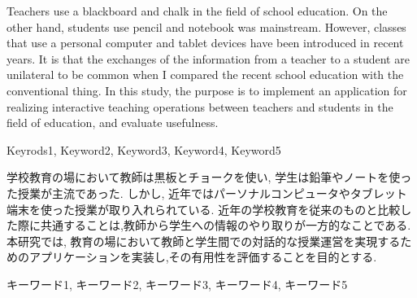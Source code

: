 \documentclass{funthesis}
\begin{document}
\maketitle       %

\begin{eabstract}
Teachers use a blackboard and chalk in the field of school education. On the other hand, students use pencil and notebook was mainstream. However, classes that use a personal computer and tablet devices have been introduced in recent years. It is that the exchanges of the information from a teacher to a student are unilateral to be common when I compared the recent school education with the conventional thing. In this study, the purpose is to implement an application for realizing interactive teaching operations between teachers and students in the field of education, and evaluate usefulness.
\end{eabstract}

\begin{ekeyword}
Keyrods1, Keyword2, Keyword3, Keyword4, Keyword5
\end{ekeyword}

\begin{jabstract}
学校教育の場において教師は黒板とチョークを使い, 学生は鉛筆やノートを使った授業が主流であった. しかし, 近年ではパーソナルコンピュータやタブレット端末を使った授業が取り入れられている. 近年の学校教育を従来のものと比較した際に共通することは,教師から学生への情報のやり取りが一方的なことである.本研究では, 教育の場において教師と学生間での対話的な授業運営を実現するためのアプリケーションを実装し,その有用性を評価することを目的とする.

\end{jabstract}

\begin{jkeyword}
キーワード1, キーワード2, キーワード3, キーワード4, キーワード5
\end{jkeyword}

\tableofcontents %


\end{document}
